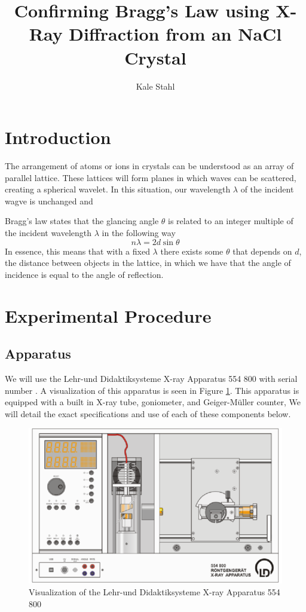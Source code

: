 \documentclass[]{article}
\title{Confirming Bragg's Law using X-Ray Diffraction from an NaCl Crystal}
\author{Kale Stahl}
\begin{document}
	
	\maketitle
	\begin{abstract}
		
	\end{abstract}
	\section{Introduction}
		The arrangement of atoms or ions in crystals can be understood as an array of parallel lattice. These lattices will form planes in which waves can be scattered, creating a spherical wavelet. In this situation, our wavelength $\lambda$ of the incident wagve is unchanged and 
		
		Bragg's law states that the glancing angle $\theta$ is related to an integer multiple of the incident wavelength $\lambda$ in the following way
		\begin{equation}
			n\lambda = 2d\sin \theta \label{bragg's law}
		\end{equation}
		In essence, this means that with a fixed $\lambda$ there exists some $\theta$ that depends on $d$, the distance between objects in the lattice, in which we have that the angle of incidence is equal to the angle of reflection.
		
	\section{Experimental Procedure}
		\subsection{Apparatus}
		We will use the Lehr-und Didaktiksysteme X-ray Apparatus 554 800 with serial number . A visualization of this apparatus is seen in Figure \ref{apparatus}. This apparatus is equipped with a built in X-ray tube, goniometer, and Geiger-M\"uller counter, We will detail the exact specifications and use of each of these components below.
		\begin{figure}[h!]
			\begin{center}
				\includegraphics[width = .45\textwidth]{apparatus}
			\end{center}
			\caption{Visualization of the Lehr-und Didaktiksysteme X-ray Apparatus 554 800}
			\label{apparatus}
		\end{figure}
\end{document}

